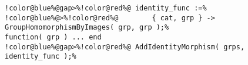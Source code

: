 \begin{Verbatim}[commandchars=!@\%,frame=single]
!color@blue%@gap>%!color@red%@ identity_func :=%
!color@blue%@>%!color@red%@        { cat, grp } -> GroupHomomorphismByImages( grp, grp );%
function( grp ) ... end
!color@blue%@gap>%!color@red%@ AddIdentityMorphism( grps, identity_func );%
\end{Verbatim}

